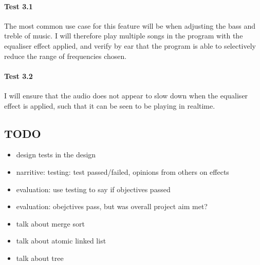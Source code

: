 \paragraph{Test 3.1}
The most common use case for this feature will be when adjusting the bass and treble of music. I will therefore play multiple songs in the program with the equaliser effect applied, and verify by ear that the program is able to selectively reduce the range of frequencies chosen.

\paragraph{Test 3.2}
I will ensure that the audio does not appear to slow down when the equaliser effect is applied, such that it can be seen to be playing in realtime.


\pagebreak
\subsection{TODO}
\begin{itemize}
	\item design tests in the design
	\item narritive: testing: test passed/failed, opinions from others on effects
	\item evaluation: use testing to say if objectives passed
	\item evaluation: obejctives pass, but was overall project aim met?
	\item talk about merge sort
	\item talk about atomic linked list
	\item talk about tree
\end{itemize}